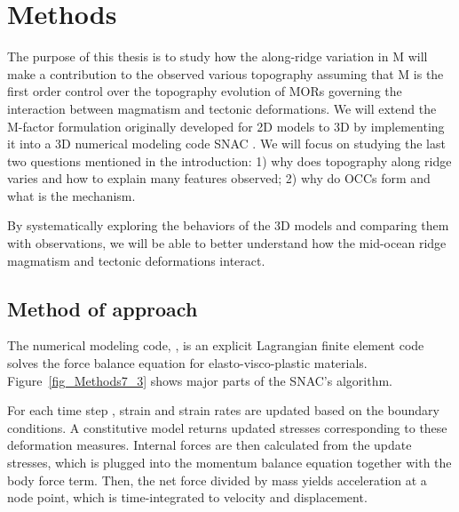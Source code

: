\pagebreak
\section{Methods}
\label{ch:Methods}
The purpose of this thesis is to study how the along-ridge variation in M will make a contribution to the observed various topography assuming that M is the first order control over the topography evolution of MORs governing the interaction between magmatism and tectonic deformations.
We will extend the M-factor formulation originally developed for 2D models to 3D by implementing it into a 3D numerical modeling code SNAC \citep{Choi2008}. We will focus on studying the last two questions mentioned in the introduction: 1) why does topography along ridge varies and how to explain many features observed; 2) why do OCCs form and what is the mechanism. 

By systematically exploring the behaviors of the 3D models and comparing them with observations, we will be able to better understand  how the mid-ocean ridge magmatism and tectonic deformations interact. 

\subsection{Method of approach}
The numerical modeling code, , is an explicit Lagrangian finite element code solves the force  balance equation for elasto-visco-plastic materials. Figure~\ref{fig_Methods7_3} shows major parts of the SNAC's algorithm. 

For each time step , strain and strain rates are updated based on the  boundary conditions. %
A constitutive model returns updated stresses corresponding to these deformation measures. Internal forces are then calculated from the update stresses, which is plugged into the momentum balance equation together with the body force term. Then, the  net force divided by  mass yields acceleration at a node point, which is time-integrated to velocity and displacement. 

